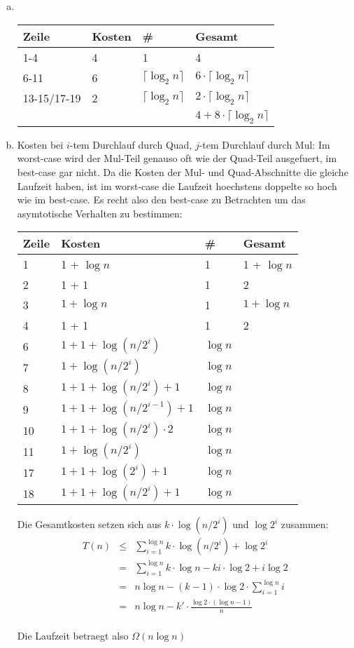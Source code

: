 \begin{enumerate}[(a)]
\item \ 

\begin{tabular}[h]{l|lll}
Zeile & Kosten & \# & Gesamt\\\hline
1-4  &  4 & 1 & 4\\
6-11 &  6 & $\lceil \log_2 n \rceil$ & $6 \cdot \lceil \log_2 n \rceil$ \\
13-15/17-19 &  2 & $\lceil \log_2 n \rceil$ & $2 \cdot \lceil \log_2 n \rceil$ \\\hline
&&& $4+8\cdot \lceil \log_2 n \rceil$
\end{tabular}

\item
Kosten bei $i$-tem Durchlauf durch Quad, $j$-tem Durchlauf durch Mul:
Im worst-case wird der Mul-Teil genauso oft wie der Quad-Teil ausgefuert,
im best-case gar nicht. Da die Kosten der Mul- und Quad-Abschnitte die gleiche Laufzeit haben,
ist im worst-case die Laufzeit hoechstens doppelte so hoch wie im best-case.
Es recht also den best-case zu Betrachten um das asymtotische Verhalten zu bestimmen:

\begin{tabular}[h]{l|lll}
Zeile & Kosten & \# & Gesamt\\\hline
1 & 1 + $\log n$ & 1 & 1 + $\log n$\\
2 & 1 + 1 & 1 & 2\\
3 & $1 + \log n$ & 1 & $1 + \log n$\\
4 & 1 + 1 & 1 & 2 \\
6 & $1+1 + \log (n/2^i)$ & $\log n$\\
7 & $1 + \log (n/2^i)$ & $\log n$\\
8 & $1+1+\log (n/2^i)+1$ & $\log n$\\
9 & $1+1+\log (n/2^{i-1})+1 $ & $\log n$\\
10 & $1+1+\log (n/2^i)\cdot 2$ & $\log n$\\
11 & $1 + \log (n/2^i) $ & $\log n$\\
17 & $1+1 + \log (2^i) + 1 $ & $\log n$\\
18 & $1+1 + \log (n/2^i) + 1 $ & $\log n$\\\hline
\end{tabular}

Die Gesamtkosten setzen sich aus $k \cdot \log (n/2^i)$ und $\log 2^i$ zusammen:
\begin{eqnarray}
T(n) &\leq& \sum_{i=1}^{\log n} k \cdot \log (n/2^i) + \log 2^i \\
     &=& \sum_{i=1}^{\log n} k \cdot \log n - ki \cdot \log 2 + i \log 2 \\
     &=& n \log n - (k-1) \cdot \log 2\cdot  \sum_{i=1}^{\log n} i \\
     &=& n \log n - k' \cdot \frac{\log 2 \cdot (\log n - 1)}{n} \\
\end{eqnarray}

Die Laufzeit betraegt also $\Omega(n \log n)$

\end{enumerate}

